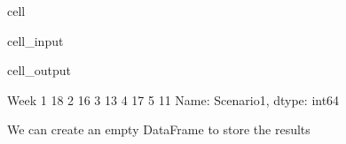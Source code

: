 \documentclass[letterpaper,10pt,english]{jupyterBook}
\begin{document}
\begin{sphinxuseclass}{cell}\begin{sphinxVerbatimInput}

\begin{sphinxuseclass}{cell_input}
\begin{sphinxVerbatim}[commandchars=\\\{\}]
    
    

    
    

  \PYG{p}{[}\PYG{p}{]} 
\end{sphinxVerbatim}

\end{sphinxuseclass}\end{sphinxVerbatimInput}
\begin{sphinxVerbatimOutput}

\begin{sphinxuseclass}{cell_output}
\begin{sphinxVerbatim}[commandchars=\\\{\}]
Week
1    18
2    16
3    13
4    17
5    11
Name: Scenario1, dtype: int64
\end{sphinxVerbatim}

\end{sphinxuseclass}\end{sphinxVerbatimOutput}

\end{sphinxuseclass}
\sphinxAtStartPar
We can create an empty DataFrame to store the results
\end{document}
